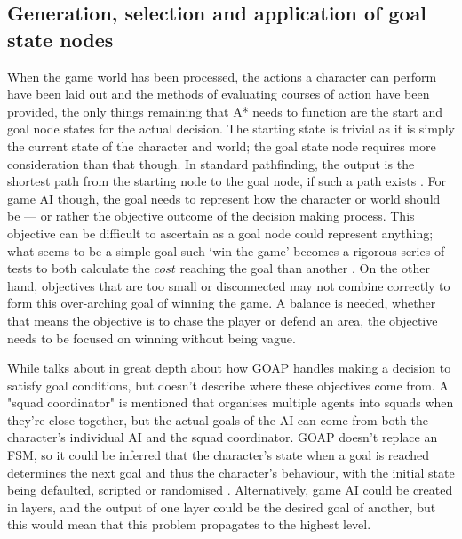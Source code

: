 \documentclass[11pt, a4paper]{report}
\begin{document}
\subsection{Generation, selection and application of goal state nodes}
\label{subsec:generationSelectionAndApplicationOfStateNodes}

When the game world has been processed, the actions a character can perform have been laid out and the methods of evaluating courses of action have been provided, the only things remaining that A* needs to function are the start and goal node states for the actual decision. The starting state is trivial as it is simply the current state of the character and world; the goal state node requires more consideration than that though. In standard pathfinding, the output is the shortest path from the starting node to the goal node, if such a path exists \parencite[61]{nareyek2004ai}. For game AI though, the goal needs to represent how the character or world should be --- or rather the objective outcome of the decision making process. This objective can be difficult to ascertain as a goal node could represent anything; what seems to be a simple goal such `win the game' becomes a rigorous series of tests to both calculate the $cost$ reaching the goal than another \parencite[403]{harmon2002economic}. On the other hand, objectives that are too small or disconnected may not combine correctly to form this over-arching goal of winning the game. A balance is needed, whether that means the objective is to chase the player or defend an area, the objective needs to be focused on winning without being vague.

While \citeauthor{orkin2003applying} \parencite*{orkin2003applying} talks about in great depth about how GOAP handles making a decision to satisfy goal conditions, but doesn't describe where these objectives come from. A "squad coordinator" is mentioned \parencite[13]{orkin2003applying} that organises multiple agents into squads when they're close together, but the actual goals of the AI can come from both the character's individual AI and the squad coordinator. GOAP doesn't replace an FSM, so it could be inferred that the character's state when a goal is reached determines the next goal and thus the character's behaviour, with the initial state being defaulted, scripted or randomised \parencite[2]{orkin2003applying}. Alternatively, game AI could be created in layers, and the output of one layer could be the desired goal of another, but this would mean that this problem propagates to the highest level. 
\end{document}

